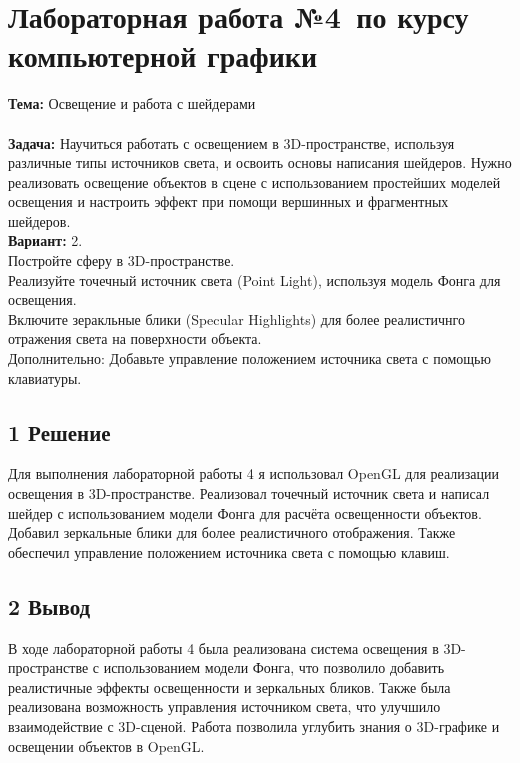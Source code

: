 \documentclass[12pt]{article}
\begin{document}




\section*{Лабораторная работа №4\, по курсу компьютерной графики}

\textbf{Тема:} Освещение и работа с шейдерами\\
\\
\textbf{Задача:} Научиться работать с освещением в 3D-пространстве, используя различные типы источников света, и освоить основы написания шейдеров. 
Нужно реализовать освещение объектов в сцене с использованием простейших моделей освещения и настроить эффект при помощи вершинных и фрагментных шейдеров.\\
\textbf{Вариант:} 2. \\
Постройте сферу в 3D-пространстве.\\
Реализуйте точечный источник света (Point Light), используя модель Фонга для освещения.\\
Включите зеракльные блики (Specular Highlights) для более реалистичнго отражения света на поверхности объекта.\\
Дополнительно: Добавьте управление положением источника света с помощью клавиатуры.\\

\subsection*{1 Решение}
Для выполнения лабораторной работы 4 я использовал OpenGL для реализации освещения в 3D-пространстве. 
Реализовал точечный источник света и написал шейдер с использованием модели Фонга для расчёта освещенности объектов. 
Добавил зеркальные блики для более реалистичного отображения. 
Также обеспечил управление положением источника света с помощью клавиш.

\subsection*{2 Вывод}
В ходе лабораторной работы 4 была реализована система освещения в 3D-пространстве с использованием модели Фонга, что позволило добавить реалистичные эффекты освещенности и зеркальных бликов. 
Также была реализована возможность управления источником света, что улучшило взаимодействие с 3D-сценой. 
Работа позволила углубить знания о 3D-графике и освещении объектов в OpenGL.
\end{document}
